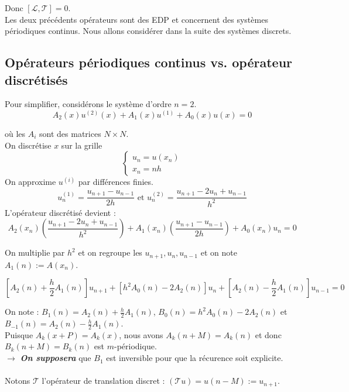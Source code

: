 \documentclass[12pt,a4paper]{article}
\begin{document}
	Donc $\left[\mathcal L, \mathcal T\right] = 0$.\\
	Les deux précédents opérateurs sont des EDP et concernent des systèmes périodiques continus. Nous allons considérer dans la suite des systèmes discrets.
	
	\subsection{Opérateurs périodiques continus vs. opérateur discrétisés}
	
	Pour simplifier, considérons le système d'ordre $n = 2$.
	\[
	A_2(x)u^{(2)}(x) + A_1(x)u^{(1)} + A_0(x)u(x) = 0
	\]
	
	\vspace{-.5cm}
	
	où les $A_i$ sont des matrices $N\times N$.\\
	On discrétise $x$ sur la grille \[\begin{cases}
		u_n = u(x_n)\\
		x_n = nh
	\end{cases}\] 
	On approxime $u^{(i)}$ par différences finies.
	\[
	u_n^{(1)} = \frac{u_{n+1} - u_{n-1}}{2h} \text { et } u_n^{(2)} = \frac{u_{n+1}-2u_n+u_{n-1}}{h^2}
	\]
	L'opérateur discrétisé devient :
	\[
	A_2(x_n)\left(\frac{u_{n+1}-2u_n+u_{n-1}}{h^2}\right) + A_1(x_n)\left(\frac{u_{n+1}-u_{n-1}}{2h}\right) + A_0(x_n)u_n = 0
	\]
	
	On multiplie par $h^2$ et on regroupe les $u_{n+1}, u_n, u_{n-1}$ et on note $A_1(n) := A(x_n)$.
	
	\[
	\left[A_2(n) + \frac{h}{2} A_1(n)\right]u_{n+1} + \left[h^2A_0(n) - 2A_2(n)\right] u_n + \left[A_2(n) - \frac{h}{2} A_1(n)\right]u_{n-1} = 0
	\]
	
	On note : $B_1(n) = A_2(n) + \frac{h}{2} A_1(n)$, $B_0(n) = h^2A_0(n) - 2A_2(n)$ et $B_{-1}(n) = A_2(n) - \frac{h}{2} A_1(n)$.\\
	
	Puisque $A_k(x+P)  =A_k(x)$, nous avons $A_k(n+M) = A_k(n)$ et donc $B_k(n+M) = B_k(n)$ est $m$-périodique.\\
	
	$\longrightarrow$ \textit{\textbf{On supposera}} que $B_1$ est inversible pour que la récurence soit explicite.\\\\
	Notons $\mathcal T$ l'opérateur de translation discret : $\left(\mathcal T u\right) = u(n-M) := u_{n+1}.$\\
	
\end{document}
